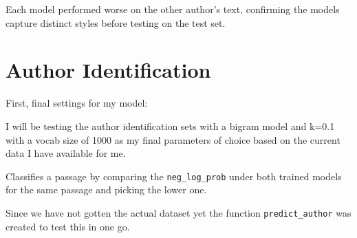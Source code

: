 \documentclass[11pt]{article}
\begin{document}
Each model performed worse on the other author's text, confirming the models capture distinct styles before testing on the test set.

\section{Author Identification}

First, final settings for my model:

I will be testing the author identification sets with a bigram model and k=0.1 with a vocab size of 1000 as my final parameters of choice based on the current data I have available for me.

Classifies a passage by comparing the \texttt{neg\_log\_prob} under both trained models for the same passage and picking the lower one.

Since we have not gotten the actual dataset yet the function \texttt{predict\_author} was created to test this in one go.


\end{document}
